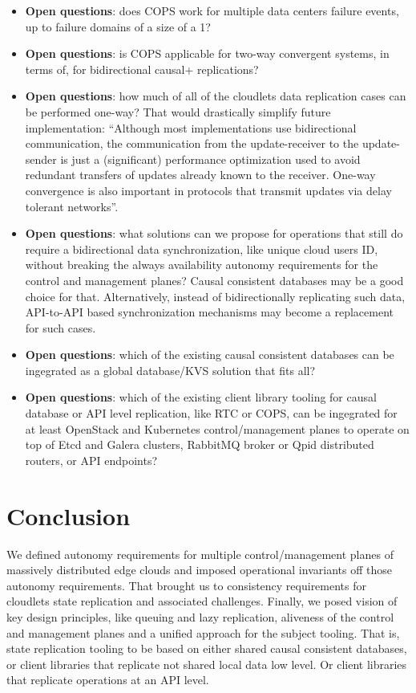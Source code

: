 \documentclass[conference]{IEEEtran}
\begin{document}
\begin{itemize}
  \item \textbf{Open questions}: does COPS work for multiple data centers
    failure events, up to failure domains of a size of a 1?
  \item \textbf{Open questions}: is COPS applicable for two-way convergent
    systems, in terms of\cite{b2}, for bidirectional causal+ replications?
  \item \textbf{Open questions}: how much of all of the cloudlets data
    replication cases can be performed one-way? That would drastically simplify
    future implementation: ``Although most implementations use bidirectional
    communication, the communication from the update-receiver to the
    update-sender is just a (significant) performance optimization used to
    avoid redundant transfers of updates already known to the receiver. One-way
    convergence is also important in protocols that transmit updates via delay
    tolerant networks''\cite{b2}.
  \item \textbf{Open questions}: what solutions can we propose for operations
    that still do require a bidirectional data synchronization, like unique
    cloud users ID, without breaking the always availability autonomy
    requirements for the control and management planes? Causal
    consistent databases\cite{b6} may be a good choice for that. Alternatively, instead
    of bidirectionally replicating such data, API-to-API based
    synchronization mechanisms may become a replacement for such cases.
  \item \textbf{Open questions}: which of the existing causal consistent
    databases\cite{b6} can be ingegrated as a global database/KVS solution that
    fits all?
  \item \textbf{Open questions}: which of the existing client library tooling
    for causal database or API level replication, like RTC or COPS, can be
    ingegrated for at least OpenStack and Kubernetes control/management planes
    to operate on top of Etcd and Galera clusters, RabbitMQ broker or Qpid
    distributed routers, or API endpoints?
\end{itemize}

\section{Conclusion}

We defined autonomy requirements for multiple control/management planes of
massively distributed edge clouds and imposed operational invariants off
those autonomy requirements. That brought us to consistency requirements for
cloudlets state replication and associated challenges. Finally, we posed
vision of key design principles, like queuing and lazy replication, aliveness
of the control and management planes and a unified approach for the subject
tooling. That is, state replication tooling to be based on either shared causal
consistent databases, or client libraries that replicate not shared local data
low level. Or client libraries that replicate operations at an API level.
\end{document}
